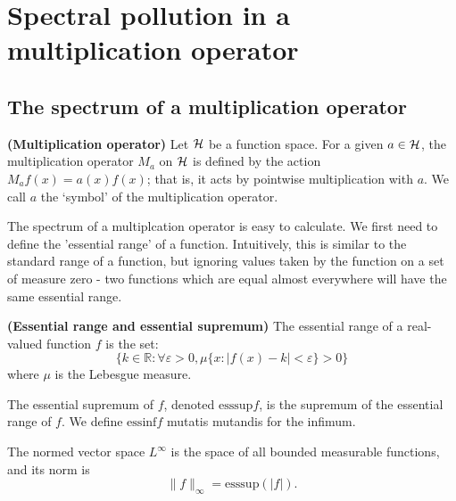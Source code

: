 \documentclass[../main.tex]{subfiles}
\begin{document}
\section{Spectral pollution in a multiplication operator}
\subsection{The spectrum of a multiplication operator}
\begin{definition}{\textbf{(Multiplication operator)}}
Let $\mathcal{H}$ be a function space. For a given $a \in \mathcal{H}$, the multiplication operator $M_a$ on $\mathcal{H}$ is defined by
the action $M_af(x) = a(x)f(x)$; that is, it acts by pointwise multiplication with $a$. We call $a$ the `symbol' of
the multiplication operator.
\end{definition}

The spectrum of a multiplcation operator is easy to calculate. We first
need to define the 'essential range' of a function. Intuitively, this is
similar to the standard range of a function, but ignoring values taken by
the function on a set of measure zero - two functions which are equal
almost everywhere will have the same essential range.

\begin{definition}{\textbf{(Essential range and essential supremum)}}\label{defn:essential-range}
  The essential range of a real-valued function $f$ is the set:
  $$\{k \in \mathbb{R} : \forall \varepsilon > 0, \mu\{x : |f(x) - k| < \varepsilon\} > 0\}$$
  where $\mu$ is the Lebesgue measure.
  
  The essential supremum of $f$, denoted $\mathrm{esssup}f$, is the supremum of the essential range of $f$. 
  We define $\mathrm{essinf}f$ mutatis mutandis for the infimum.
\end{definition}

The normed vector space $L^\infty$ is the space of all bounded measurable functions, and its norm is $$\|f\|_\infty = \text{esssup}(|f|).$$
\end{document}
